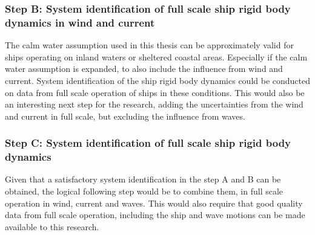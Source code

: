 \subsubsection*{Step B: System identification of full scale ship rigid body dynamics in wind and current}
The calm water assumption used in this thesis can be approximately valid for ships operating on inland waters or sheltered coastal areas. Especially if the calm water assumption is expanded, to also include the influence from wind and current. System identification of the ship rigid body dynamics could be conducted on data from full scale operation of ships in these conditions. This would also be an interesting next step for the research, adding the uncertainties from the wind and current in full scale, but excluding the influence from waves.

\subsubsection*{Step C: System identification of full scale ship rigid body dynamics}
Given that a satisfactory system identification in the step A and B can be obtained, the logical following step would be to combine them, in full scale operation in wind, current and waves. This would also require that good quality data from full scale operation, including the ship and wave motions can be made available to this research.  